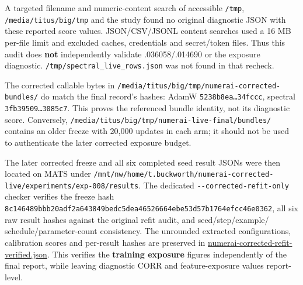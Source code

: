 \documentclass[
  british,
  10pt,
  a4paper,
]{article}
\begin{document}
A targeted filename and numeric-\allowbreak{}content search of
accessible \texttt{/tmp},
\texttt{/\allowbreak{}media/\allowbreak{}titus/\allowbreak{}big/\allowbreak{}tmp}
and the study found no original diagnostic JSON with these reported
score values. JSON/\allowbreak{}CSV/\allowbreak{}JSONL content searches
used a 16 MB per-file limit and excluded caches, credentials and
secret/\allowbreak{}token files. Thus this audit does \textbf{not}
independently validate
.\allowbreak{}036058/\allowbreak{}.\allowbreak{}014690 or the exposure
diagnostic.\allowbreak{}
\texttt{/\allowbreak{}tmp/\allowbreak{}spectral\_\allowbreak{}live\_\allowbreak{}rows.\allowbreak{}json}
was not found in that recheck.

The corrected callable bytes in
\texttt{/\allowbreak{}media/\allowbreak{}titus/\allowbreak{}big/\allowbreak{}tmp/\allowbreak{}numerai-\allowbreak{}corrected-\allowbreak{}bundles/\allowbreak{}}
do match the final record's hashes: AdamW
\texttt{5238b8ea…34f\allowbreak{}ccc}, spectral
\texttt{3fb39509…308\allowbreak{}5c7}. This proves the referenced bundle
identity, not its diagnostic score. Conversely,\allowbreak{}
\texttt{/\allowbreak{}media/\allowbreak{}titus/\allowbreak{}big/\allowbreak{}tmp/\allowbreak{}numerai-\allowbreak{}live-\allowbreak{}final/\allowbreak{}bundles/\allowbreak{}}
contains an older freeze with 20,000 updates in each arm; it should not
be used to authenticate the later corrected exposure budget.

The later corrected freeze and all six completed seed result JSONs were
then located on MATS under
\texttt{/\allowbreak{}mnt/\allowbreak{}nw/\allowbreak{}home/\allowbreak{}t.\allowbreak{}buckworth/\allowbreak{}numerai-\allowbreak{}corrected-\allowbreak{}live/\allowbreak{}experiments/\allowbreak{}exp-\allowbreak{}008/\allowbreak{}results}.
The dedicated
\texttt{-\allowbreak{}-\allowbreak{}corrected-\allowbreak{}refit-\allowbreak{}only}
checker verifies the freeze hash
\texttt{8c146489bbb2\allowbreak{}0adf2a643849\allowbreak{}bedc5dea4652\allowbreak{}6664ebe53d57\allowbreak{}b1764efcc46e\allowbreak{}0362},
all six raw result hashes against the original refit audit, and
seed/\allowbreak{}step/\allowbreak{}example/\allowbreak{}
schedule/\allowbreak{}parameter-\allowbreak{}count
consistency.\allowbreak{} The unrounded extracted
configuratio\allowbreak{}ns,\allowbreak{} calibration scores and
per-result hashes are preserved in
\href{../audit/numerai-corrected-refit-verified.json}{numerai-\allowbreak{}corrected-\allowbreak{}refit-\allowbreak{}verified.\allowbreak{}json}.
This verifies the \textbf{training exposure} figures independently of
the final report, while leaving diagnostic CORR and
feature-\allowbreak{}exposure values
report-\allowbreak{}level.\allowbreak{}
\end{document}
